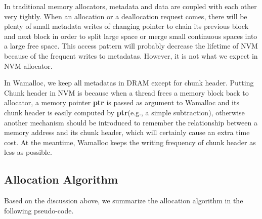 \documentclass{vldb}
\begin{document}
In traditional memory allocators, metadata and data are coupled with each other very tightly.
When an allocation or a deallocation request comes, 
there will be plenty of small metadata writes of changing pointer to chain its previous block and next block 
in order to split large space or merge small continuous spaces into a large free space.
This access pattern will probably decrease the lifetime of NVM because of the frequent writes to metadatas.
However, it is not what we expect in NVM allocator.

In Wamalloc, we keep all metadatas in DRAM except for chunk header. 
Putting Chunk header in NVM is because when a thread frees a memory block back to allocator, 
a memory pointer \textbf{ptr} is passed as argument to Wamalloc and 
its chunk header is easily computed by \textbf{ptr}(e.g., a simple subtraction),
otherwise another mechanism should be introduced to remember the relationship between a memory address and its chunk header,
which will certainly cause an extra time cost.
At the meantime, Wamalloc keeps the writing frequency of chunk header as less as possible. 

\subsection{Allocation Algorithm}

Based on the discussion above, we summarize the allocation algorithm in the following pseudo-code.
\end{document}
